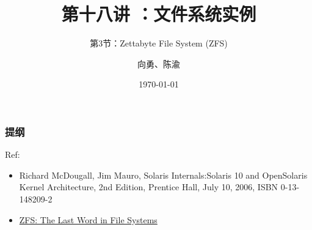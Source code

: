 


\title[第18讲]{第十八讲 ：文件系统实例} %
\subtitle{第3节：Zettabyte File System (ZFS)}
\author{向勇、陈渝} %
\date{\today} %



\begin{frame}
\titlepage %
\end{frame}

\begin{frame}
\frametitle{提纲} %
\tableofcontents %

\pause
Ref:
    \begin{itemize}
        \item Richard McDougall, Jim Mauro, Solaris Internals:Solaris 10 and OpenSolaris Kernel Architecture, 2nd Edition, Prentice Hall, July 10, 2006, ISBN 0-13-148209-2
        \item \href{http://pages.cs.wisc.edu/~remzi/OSTEP/Citations/zfs_last.pdf}{ZFS: The Last Word in File Systems}
    \end{itemize}

\end{frame}
% 
% 
% 
% 
